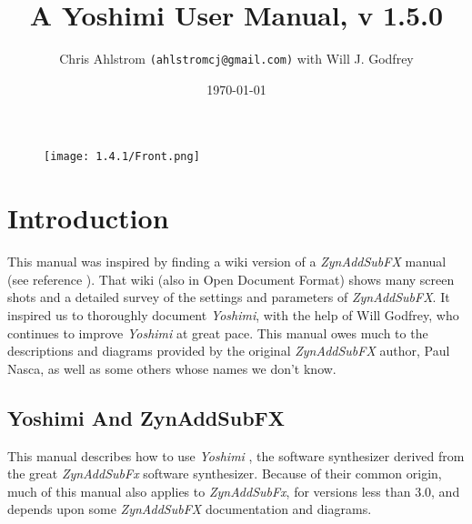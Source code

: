 \documentclass[
 11pt,
 twoside,
 a4paper,
 final                                 %
]{article}
\begin{document}
\title{A Yoshimi User Manual, v 1.5.0}
\author{Chris Ahlstrom \texttt{(ahlstromcj@gmail.com)} with Will J. Godfrey}
\date{\today}
\maketitle

\begin{figure}[H]
   \centering 
   \texttt{[image: 1.4.1/Front.png]}
\end{figure}

\clearpage                             %

\tableofcontents
\listoffigures                         %
\listoftables                          %


\setlength{\parindent}{0pt}
\setlength{\parskip}{1ex plus 0.5ex minus 0.2ex}

\section{Introduction}
\label{sec:introduction}

   This manual was inspired by finding a wiki version of a
   \textsl{ZynAddSubFX} manual (see reference \cite{zynwiki}).  That wiki
   (also in Open Document Format) shows many screen shots and a
   detailed survey of the settings and parameters of \textsl{ZynAddSubFX}.  It
   inspired us to thoroughly document \textsl{Yoshimi}, with the help of
   Will Godfrey, who continues to improve \textsl{Yoshimi} at great pace.
   This manual owes much to the descriptions and diagrams provided by the
   original \textsl{ZynAddSubFX} author, Paul Nasca, as well as some others
   whose names we don't know.

\subsection{Yoshimi And ZynAddSubFX}
\label{subsec:introduction_yoshimi_vs_zyn}

   This manual describes how to use \textsl{Yoshimi} \cite{yoshimi},
   the software synthesizer derived from the great
   \textsl{ZynAddSubFx} \cite{zynaddsubfx} software
   synthesizer.  Because of their common origin, much of this manual also
   applies to \textsl{ZynAddSubFx}, for versions less than 3.0,
   and depends upon some \textsl{ZynAddSubFX} documentation and diagrams.
\end{document}
